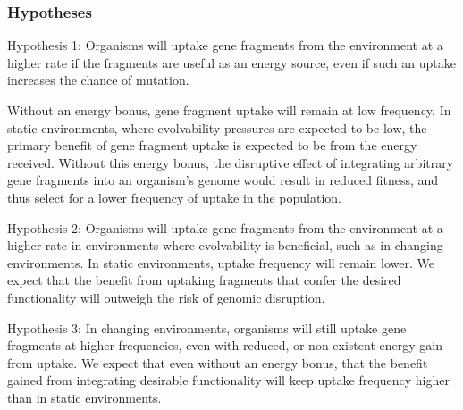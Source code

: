\subsubsection{Hypotheses}

Hypothesis 1: Organisms will uptake gene fragments from the environment at a higher rate if the fragments are useful as an energy source, even if such an uptake increases the chance of mutation. 

Without an energy bonus, gene fragment uptake will remain at low frequency. In static environments, where evolvability pressures are expected to be low, the primary benefit of gene fragment uptake is expected to be from the energy received. Without this energy bonus, the disruptive effect of integrating arbitrary gene fragments into an organism’s genome would result in reduced fitness, and thus select for a lower frequency of uptake in the population.

Hypothesis 2: Organisms will uptake gene fragments from the environment at a higher rate in environments where evolvability is beneficial, such as in changing environments. In static environments, uptake frequency will remain lower. We expect that the benefit from uptaking fragments that confer the desired functionality will outweigh the risk of genomic disruption.

Hypothesis 3: In changing environments, organisms will still uptake gene fragments at higher frequencies, even with reduced, or non-existent energy gain from uptake. We expect that even without an energy bonus, that the benefit gained from integrating desirable functionality will keep uptake frequency higher than in static environments.